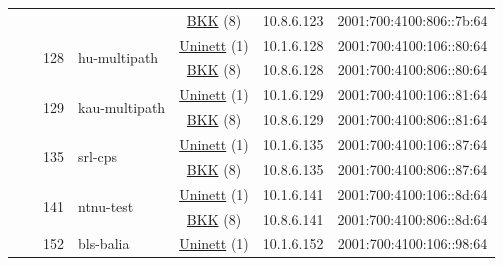 \begin{small}
\begin{center}
\begin{longtable}{|c|c|c|c|c|c|c|c|}
  &  &  &  & \multicolumn{2}{|c|}{\tiny{\href{http://bkk.no}{BKK} (8)}} & \tiny{10.8.6.123} & \tiny{2001:700:4100:806::7b:64} \\* \cline{3-3}\cline{4-4}\cline{5-5}\cline{6-6}\cline{7-7}\cline{8-8}
  &  & \multirow{2}{*}{\tiny{128}} & \multicolumn{1}{|l|}{\multirow{2}{*}{\tiny{hu-multipath}}} & \multicolumn{2}{|c|}{\tiny{\href{https://www.uninett.no}{Uninett} (1)}} & \tiny{10.1.6.128} & \tiny{2001:700:4100:106::80:64} \\* \cline{5-5}\cline{6-6}\cline{7-7}\cline{8-8}
  &  &  &  & \multicolumn{2}{|c|}{\tiny{\href{http://bkk.no}{BKK} (8)}} & \tiny{10.8.6.128} & \tiny{2001:700:4100:806::80:64} \\* \cline{3-3}\cline{4-4}\cline{5-5}\cline{6-6}\cline{7-7}\cline{8-8}
  &  & \multirow{2}{*}{\tiny{129}} & \multicolumn{1}{|l|}{\multirow{2}{*}{\tiny{kau-multipath}}} & \multicolumn{2}{|c|}{\tiny{\href{https://www.uninett.no}{Uninett} (1)}} & \tiny{10.1.6.129} & \tiny{2001:700:4100:106::81:64} \\* \cline{5-5}\cline{6-6}\cline{7-7}\cline{8-8}
  &  &  &  & \multicolumn{2}{|c|}{\tiny{\href{http://bkk.no}{BKK} (8)}} & \tiny{10.8.6.129} & \tiny{2001:700:4100:806::81:64} \\* \cline{3-3}\cline{4-4}\cline{5-5}\cline{6-6}\cline{7-7}\cline{8-8}
  &  & \multirow{2}{*}{\tiny{135}} & \multicolumn{1}{|l|}{\multirow{2}{*}{\tiny{srl-cps}}} & \multicolumn{2}{|c|}{\tiny{\href{https://www.uninett.no}{Uninett} (1)}} & \tiny{10.1.6.135} & \tiny{2001:700:4100:106::87:64} \\* \cline{5-5}\cline{6-6}\cline{7-7}\cline{8-8}
  &  &  &  & \multicolumn{2}{|c|}{\tiny{\href{http://bkk.no}{BKK} (8)}} & \tiny{10.8.6.135} & \tiny{2001:700:4100:806::87:64} \\* \cline{3-3}\cline{4-4}\cline{5-5}\cline{6-6}\cline{7-7}\cline{8-8}
  &  & \multirow{2}{*}{\tiny{141}} & \multicolumn{1}{|l|}{\multirow{2}{*}{\tiny{ntnu-test}}} & \multicolumn{2}{|c|}{\tiny{\href{https://www.uninett.no}{Uninett} (1)}} & \tiny{10.1.6.141} & \tiny{2001:700:4100:106::8d:64} \\* \cline{5-5}\cline{6-6}\cline{7-7}\cline{8-8}
  &  &  &  & \multicolumn{2}{|c|}{\tiny{\href{http://bkk.no}{BKK} (8)}} & \tiny{10.8.6.141} & \tiny{2001:700:4100:806::8d:64} \\* \cline{3-3}\cline{4-4}\cline{5-5}\cline{6-6}\cline{7-7}\cline{8-8}
  &  & \multirow{2}{*}{\tiny{152}} & \multicolumn{1}{|l|}{\multirow{2}{*}{\tiny{bls-balia}}} & \multicolumn{2}{|c|}{\tiny{\href{https://www.uninett.no}{Uninett} (1)}} & \tiny{10.1.6.152} & \tiny{2001:700:4100:106::98:64} \\* \cline{5-5}\cline{6-6}\cline{7-7}\cline{8-8}

\end{longtable}
\end{center}
\end{small}
